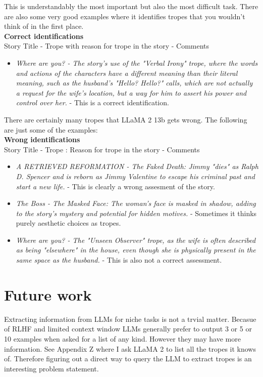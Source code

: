 \documentclass[11pt]{article}
\begin{document}
This is understandably the most important but also the most difficult task.
There are also some very good examples where it identifies tropes that you wouldn't think of in the first place.\\
\textbf{Correct identifications}\\
Story Title - Trope with reason for trope in the story - Comments
\begin{itemize}
  \item \textit{Where are you? - The story's use of the "Verbal Irony" trope, where the words and actions of the characters have a different meaning than their literal meaning, such as the husband's "Hello? Hello?" calls, which are not actually a request for the wife's location, but a way for him to assert his power and control over her.} - This is a correct identification.
\end{itemize}

There are certainly many tropes that LLaMA 2 13b gets wrong. The following are just some of the examples:\\
\textbf{Wrong identifications}\\
Story Title - Trope : Reason for trope in the story - Comments\\
\begin{itemize}
  \item \textit{A RETRIEVED REFORMATION - The Faked Death: Jimmy "dies" as Ralph D. Spencer and is reborn as Jimmy Valentine to escape his criminal past and start a new life.} - This is clearly a wrong assesment of the story.
  \item \textit{The Boss - The Masked Face: The woman's face is masked in shadow, adding to the story's mystery and potential for hidden motives.} - Sometimes it thinks purely aesthetic choices as tropes.
  \item \textit{Where are you? - The "Unseen Observer" trope, as the wife is often described as being "elsewhere" in the house, even though she is physically present in the same space as the husband.} - This is also not a correct assessment.
\end{itemize}

\section{Future work}
Extracting information from LLMs for niche tasks is not a trvial matter. Becasue of RLHF and limited context window LLMs generally prefer to output 3 or 5 or 10 examples when asked for a list of any kind. However they may have more information. See Appendix Z where I ask LLaMA 2 to list all the tropes it knows of. Therefore figuring out a direct way to query the LLM to extract tropes is an interesting problem statement.
\end{document}
